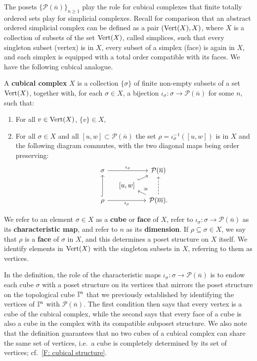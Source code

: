 The posets $\{\mathcal P(\overline n)\}_{n \geq 1}$ play the role for cubical complexes that finite totally ordered sets play for simplicial complexes.
Recall for comparison that an abstract ordered simplicial complex can be defined as a pair $({\rm Vert}(X), X)$, where $X$ is a collection of subsets of the set ${\rm Vert}(X)$, called simplices, such that every singleton subset (vertex) is in $X$, every subset of a simplex (face) is again in $X$, and each simplex is equipped with a total order compatible with its faces.
We have the following cubical analogue.

\begin{definition}\label{D:cubical}
	A \textbf{cubical complex} $X$ is a collection $\{ \sigma \}$ of finite non-empty subsets of a set ${\rm Vert}(X)$, together with, for each $\sigma \in X$, a bijection $\iota_\sigma \colon \sigma \to \mathcal P(\overline n)$ for some $n$, such that:
	\begin{enumerate}
		\item For all $v \in {\rm Vert}(X)$, $\{v\} \in X$,
		\item For all $\sigma \in X$ and all $[u,w] \subset \mathcal P(\overline n)$ the set $\rho = \iota_\sigma^{-1}([u,w])$ is in $X$ and the following diagram commutes, with the two diagonal maps being order preserving:
		\begin{equation*}
			\begin{tikzcd} [row sep = tiny, column sep = small]
				\sigma \arrow[rr, "\iota_\sigma"] && \mathcal P(\overline n) \\
				& [-5pt] {[}u,w{]} \arrow[ur, hook] & \\
				\rho \arrow[uu, hook] \arrow[rr, "\iota_\rho"'] && \mathcal P(\overline m).
				\arrow[ul, "\cong"'] \arrow[uu, dashed]
			\end{tikzcd}
		\end{equation*}
	\end{enumerate}
	We refer to an element $\sigma \in X$ as a \textbf{cube} or \textbf{face} of $X$, refer to $\iota_\sigma \colon \sigma \to \mathcal P(\overline{n})$ as its \textbf{characteristic map},
	and refer to $n$ as its \textbf{dimension}.
	If $\rho \subseteq \sigma \in X$, we say that $\rho$ is a \textbf{face} of $\sigma$ in $X$, and this determines a poset structure on $X$ itself.
	We identify elements in ${\rm Vert}(X)$ with the singleton subsets in $X$, referring to them as vertices.
\end{definition}

In the definition, the role of the characteristic maps $\iota_\sigma \colon \sigma \to \mathcal P(\overline{n})$ is to endow each cube $\sigma$ with a poset structure on its vertices that mirrors the poset structure on the topological cube $\mathbb{I}^n$ that we previously established by identifying the vertices of $\mathbb{I}^n$ with $\mathcal P(\overline n)$.
The first condition then says that every vertex is a cube of the cubical complex, while the second says that every face of a cube is also a cube in the complex with its compatible subposet structure.
We also note that the definition guarantees that no two cubes of a cubical complex can share the same set of vertices, i.e.\ a cube is completely determined by its set of vertices; cf.\ \cref{F: cubical structure}.

